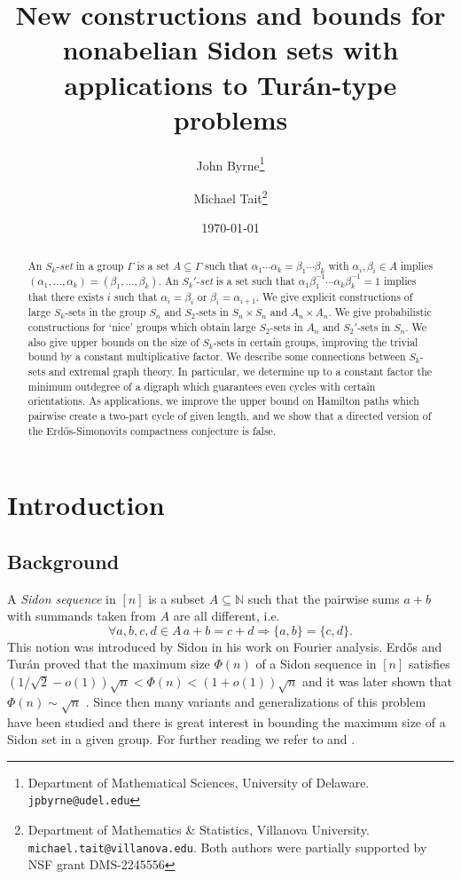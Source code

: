 \documentclass[12pt]{article}
\title{New constructions and bounds for nonabelian Sidon sets with applications to Tur\'an-type problems}
\author{John Byrne\thanks{Department of Mathematical Sciences, University of Delaware. \texttt{jpbyrne@udel.edu}} \and Michael Tait\thanks{Department of Mathematics \& Statistics, Villanova University. \texttt{michael.tait@villanova.edu}. Both authors were partially supported by NSF grant DMS-2245556}}
\date{\today}
\begin{document}
\maketitle

\begin{abstract}
    An $S_k$-\textit{set} in a group $\Gamma$ is a set $A\subseteq\Gamma$ such that $\alpha_1\cdots\alpha_k=\beta_1\cdots\beta_k$ with $\alpha_i,\beta_i\in A$ implies $(\alpha_1,\ldots,\alpha_k)=(\beta_1,\ldots,\beta_k)$. An $S_k'$-\textit{set} is a set such that $\alpha_1\beta_1^{-1}\cdots\alpha_k\beta_k^{-1}=1$ implies that there exists $i$ such that $\alpha_i=\beta_i\text{ or }\beta_i=\alpha_{i+1}$. We give explicit constructions of large $S_k$-sets in the group $S_n$ and $S_2$-sets in $S_n\times S_n$ and $A_n\times A_n$. We give probabilistic constructions for `nice' groups which obtain large $S_2$-sets in $A_n$ and $S_2'$-sets in $S_n$. We also give upper bounds on the size of $S_k$-sets in certain groups, improving the trivial bound by a constant multiplicative factor. We describe some connections between $S_k$-sets and extremal graph theory. In particular, we determine up to a constant factor the minimum outdegree of a digraph which guarantees even cycles with certain orientations. As applications, we improve the upper bound on Hamilton paths which pairwise create a two-part cycle of given length, and we show that a directed version of the Erd\H{o}s-Simonovits compactness conjecture is false.
\end{abstract}

\section{Introduction} \label{Introduction}

\subsection{Background}

A \textit{Sidon sequence} in $[n]$ is a subset $A\subseteq\mathbb N$ such that the pairwise sums $a+b$ with summands taken from $A$ are all different, i.e.
$$\forall a,b,c,d\in A\,  a+b=c+d\Longrightarrow\{a,b\}=\{c,d\}.$$
This notion was introduced by Sidon \cite{sidon1932satz} in his work on Fourier analysis. Erd\H{o}s and Tur\'an \cite{erdos1941problem} proved that the maximum size $\Phi(n)$ of a Sidon sequence in $[n]$ satisfies $(1/\sqrt 2-o(1))\sqrt n<\Phi(n)<(1+o(1))\sqrt n$ and it was later shown that $\Phi(n) \sim \sqrt{n}$ \cite{bosechowla}. Since then many variants and generalizations of this problem have been studied and there is great interest in bounding the maximum size of a Sidon set in a given group. For further reading we refer to \cite{bajnok2018additive} and \cite{o2004complete}.
\end{document}
